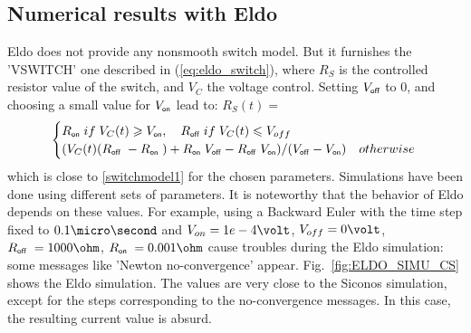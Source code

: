 \subsection{Numerical results with {\sc Eldo}}
{\sc Eldo} does not provide any nonsmooth switch model. But it furnishes the 'VSWITCH' one described in
(\ref{eq:eldo_switch}), where  $R_S$ is the controlled resistor value of the switch, and $V_{C}$ the voltage
control. Setting $V_{\off}$ to $0$, and choosing a small value for $V_{\on}$ lead to: $R_S(t)=$
 \begin{equation}
    \label{eq:eldo_switch}
\begin{cases}R_\on\;  \mbox{if}\;V_{C}(t) \geq V_{\on},  \quad R_\off\;   \mbox{if}\;V_{C}(t) \leq
    V_{off} \\ (V_{C}(t)(R_\off\;-R_\on\;)+ R_\on\; V_{\off}- 
    R_\off\;V_{\on})/(V_{\off}-V_{\on})& \mbox{otherwise}\; \end{cases}
  \end{equation}
  which is close to \eqref{switchmodel1} for the chosen parameters. Simulations have been done using
  different sets of parameters. It is noteworthy that the
behavior of {\sc Eldo} depends on these values. For example, using a Backward Euler with the time step fixed to $0.1 \micro \second$ and $V_{on}=1e-4\volt$, $V_{off}=0 \volt$,
$R_\off\; = 1000 \ohm$, $R_\on\;=0.001\ohm$ cause troubles during the {\sc Eldo}
simulation: some messages like 'Newton no-convergence' appear. Fig.~\ref{fig:ELDO_SIMU_CS}
  shows the {\sc Eldo} simulation. The values are very close to the {\sc Siconos} simulation, except for the steps corresponding to the
  no-convergence messages. In this case, the resulting current value is absurd.
